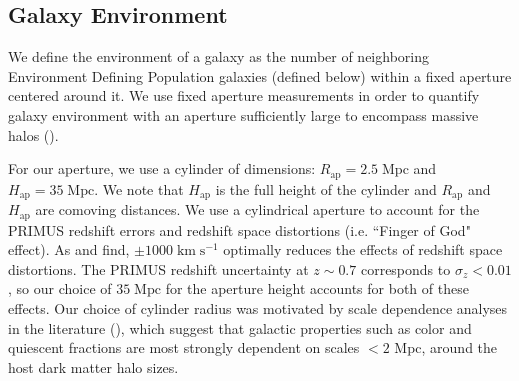 \documentclass{emulateapj}
\def \apradius{2.5}
\def \apheight{35}
\begin{document}
\subsection{Galaxy Environment} \label{sec:environment}
We define the environment of a galaxy as the number of neighboring Environment Defining Population galaxies (defined below) within a fixed aperture centered around it. We use fixed aperture measurements in order to quantify galaxy environment with an aperture sufficiently large to encompass massive halos (\citealt{Muldrew:2012aa, Skibba:2013aa}).

For our aperture, we use a cylinder of dimensions: $R_{\mathrm{ap}} = \apradius\;
\mathrm{Mpc}$ and $H_{\mathrm{ap}} = \apheight\; \mathrm{Mpc}$. 
We note that $H_\mathrm{ap}$ is the full height of the cylinder and $R_\mathrm{ap}$ 
and $H_\mathrm{ap}$ are comoving distances. We use a
cylindrical aperture to account for the PRIMUS redshift
errors and redshift space distortions (i.e. ``Finger of God"
effect). As \cite{Cooper:2005aa} and \cite{Gallazzi:2009aa} find, 
$\pm 1000 \; \mathrm{km} \;\mathrm{s^{-1}}$ optimally reduces the effects of redshift space
distortions. The PRIMUS redshift uncertainty at $z \sim 0.7$
corresponds to $\sigma_z < 0.01$, so our choice of $\apheight\;
\mathrm{Mpc}$ for the aperture height accounts for both of these effects. Our choice of
cylinder radius was motivated by scale dependence analyses in the
literature (\citealt{Blanton:2006aa, Wilman:2010aa, Muldrew:2012aa}),
which suggest that galactic properties such as color and quiescent
fractions are most strongly dependent on scales $< 2$ Mpc, around the
host dark matter halo sizes.


\end{document}
